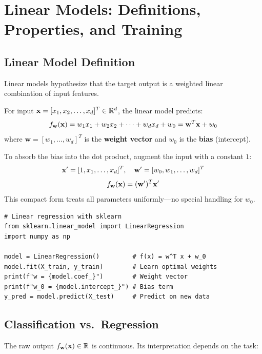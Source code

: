 \chapter*{Linear Models: Definitions, Properties, and Training}

\section*{Linear Model Definition}

Linear models hypothesize that the target output is a weighted linear combination of input features.

\begin{definition}
For input $\mathbf{x} = [x_1, x_2, \dots, x_d]^T \in \mathbb{R}^d$, the linear model predicts:
$$f_{\mathbf{w}}(\mathbf{x}) = w_1 x_1 + w_2 x_2 + \cdots + w_d x_d + w_0 = \mathbf{w}^T \mathbf{x} + w_0$$
where $\mathbf{w} = [w_1, \dots, w_d]^T$ is the \textbf{weight vector} and $w_0$ is the \textbf{bias} (intercept).
\end{definition}

\begin{remark}
To absorb the bias into the dot product, augment the input with a constant $1$:
$$\mathbf{x}' = [1, x_1, \dots, x_d]^T, \quad \mathbf{w}' = [w_0, w_1, \dots, w_d]^T$$
$$f_{\mathbf{w}}(\mathbf{x}) = (\mathbf{w}')^T \mathbf{x}'$$
This compact form treats all parameters uniformly---no special handling for $w_0$.
\end{remark}

\begin{lstlisting}[style=pythonstyle]
# Linear regression with sklearn
from sklearn.linear_model import LinearRegression
import numpy as np

model = LinearRegression()         # f(x) = w^T x + w_0
model.fit(X_train, y_train)        # Learn optimal weights
print(f"w = {model.coef_}")        # Weight vector
print(f"w_0 = {model.intercept_}") # Bias term
y_pred = model.predict(X_test)     # Predict on new data
\end{lstlisting}

\section*{Classification vs.\ Regression}

The raw output $f_{\mathbf{w}}(\mathbf{x}) \in \mathbb{R}$ is continuous. Its interpretation depends on the task:

